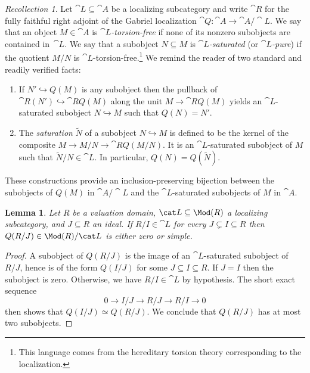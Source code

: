 \documentclass{amsart}
\numberwithin{equation}{section}%
\newtheorem{Lem}[equation]{Lemma}
\theoremstyle{remark}
\newtheorem{Rec}[equation]{Recollection}
\newcounter{enum-resume-hack}
\begin{document}
\begin{Rec}\label{rec:saturated}
	Let $\cat L \subseteq \cat A$ be a localizing subcategory and write $\cat R$ for the fully faithful right adjoint of the Gabriel localization $\cat Q\colon\cat A \to \cat A/\cat L$. We say  that an object $M \in \cat A$ is \emph{$\cat L$-torsion-free} if none of its nonzero subobjects are contained in~$\cat L$. We say that a subobject $N \subseteq M$ is \emph{$\cat L$-saturated} (or \emph{$\cat L$-pure}) if the quotient $M/N$ is $\cat L$-torsion-free.\footnote{This language comes from the hereditary torsion theory corresponding to the localization.} We remind the reader of two standard and readily verified facts:
	\begin{enumerate}
		\item If $N' \hookrightarrow Q(M)$ is any subobject then the pullback of $\cat R(N')\hookrightarrow \cat RQ(M)$ along the unit $M \to \cat RQ(M)$ yields an $\cat L$-saturated subobject $N \hookrightarrow M$ such that $Q(N)=N'$.
		\item The \emph{saturation} $\tilde{N}$ of a subobject $N \hookrightarrow M$ is defined to be the kernel of the composite $M \to M/N \to \cat RQ(M/N)$. It is an $\cat L$-saturated subobject of $M$ such that $\tilde{N}/N \in \cat L$. In particular, $Q(N)=Q(\tilde{N})$.
	\end{enumerate}
	These constructions provide an inclusion-preserving bijection between the subobjects of $Q(M)$ in $\cat A/\cat L$ and the $\cat L$-saturated subobjects of $M$ in $\cat A$.
\end{Rec}

\begin{Lem}\label{lem:cyclic-quotient}
	Let $R$ be a valuation domain, $\cat L \subseteq \Mod(R)$ a localizing subcategory, and $J \subseteq R$ an ideal. If $R/I \in \cat L$ for every $J \subsetneq I \subseteq R$ then $Q(R/J)\in\Mod(R)/\cat L$ is either zero or simple.
\end{Lem}

\begin{proof}
	A subobject of $Q(R/J)$ is the image of an $\cat L$-saturated subobject of $R/J$, hence is of the form $Q(I/J)$ for some $J \subseteq I \subseteq R$. If $J=I$ then the subobject is zero. Otherwise, we have $R/I \in \cat L$ by hypothesis. The short exact sequence
	\[
		0 \to I/J \to R/J \to R/I \to 0
	\]
	then shows that $Q(I/J) \simeq Q(R/J)$. We conclude that $Q(R/J)$ has at most two subobjects.
\end{proof}
\end{document}
